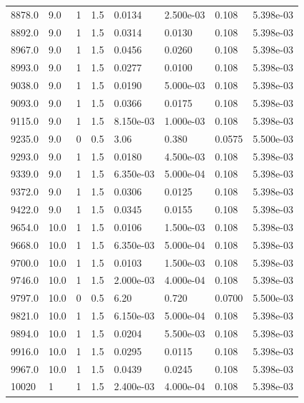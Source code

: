 \documentclass[preview]{standalone}
\begin{document}
{{{{{\begin{tabular}{L{1.2cm}C{1.2cm} C{0.3cm}C{0.5cm} C{1.4cm}C{1.4cm} C{1.4cm}C{1.4cm}}
  8878.0  &   9.0  & 1     & 1.5 &  0.0134  & 2.500e-03  & 0.108 &  5.398e-03   \\ 
  8892.0  &   9.0  & 1     & 1.5 &  0.0314  & 0.0130  & 0.108 &  5.398e-03   \\ 
  8967.0  &   9.0  & 1     & 1.5 &  0.0456  & 0.0260  & 0.108 &  5.398e-03   \\ 
  8993.0  &   9.0  & 1     & 1.5 &  0.0277  & 0.0100  & 0.108 &  5.398e-03   \\ 
  9038.0  &   9.0  & 1     & 1.5 &  0.0190  & 5.000e-03  & 0.108 &  5.398e-03   \\ 
  9093.0  &   9.0  & 1     & 1.5 &  0.0366  & 0.0175  & 0.108 &  5.398e-03   \\ 
  9115.0  &   9.0  & 1     & 1.5 &  8.150e-03  & 1.000e-03  & 0.108 &  5.398e-03   \\ 
  9235.0  &   9.0  & 0     & 0.5 &  3.06  & 0.380  & 0.0575 &  5.500e-03   \\ 
  9293.0  &   9.0  & 1     & 1.5 &  0.0180  & 4.500e-03  & 0.108 &  5.398e-03   \\ 
  9339.0  &   9.0  & 1     & 1.5 &  6.350e-03  & 5.000e-04  & 0.108 &  5.398e-03   \\ 
  9372.0  &   9.0  & 1     & 1.5 &  0.0306  & 0.0125  & 0.108 &  5.398e-03   \\ 
  9422.0  &   9.0  & 1     & 1.5 &  0.0345  & 0.0155  & 0.108 &  5.398e-03   \\ 
  9654.0  &  10.0  & 1     & 1.5 &  0.0106  & 1.500e-03  & 0.108 &  5.398e-03   \\ 
  9668.0  &  10.0  & 1     & 1.5 &  6.350e-03  & 5.000e-04  & 0.108 &  5.398e-03   \\ 
  9700.0  &  10.0  & 1     & 1.5 &  0.0103  & 1.500e-03  & 0.108 &  5.398e-03   \\ 
  9746.0  &  10.0  & 1     & 1.5 &  2.000e-03  & 4.000e-04  & 0.108 &  5.398e-03   \\ 
  9797.0  &  10.0  & 0     & 0.5 &  6.20  & 0.720  & 0.0700 &  5.500e-03   \\ 
  9821.0  &  10.0  & 1     & 1.5 &  6.150e-03  & 5.000e-04  & 0.108 &  5.398e-03   \\ 
  9894.0  &  10.0  & 1     & 1.5 &  0.0204  & 5.500e-03  & 0.108 &  5.398e-03   \\ 
  9916.0  &  10.0  & 1     & 1.5 &  0.0295  & 0.0115  & 0.108 &  5.398e-03   \\ 
  9967.0  &  10.0  & 1     & 1.5 &  0.0439  & 0.0245  & 0.108 &  5.398e-03   \\ 
  10020  &     1  & 1     & 1.5 &  2.400e-03  & 4.000e-04  & 0.108 &  5.398e-03   \\ 

\end{tabular}}}}}}
\end{document}
